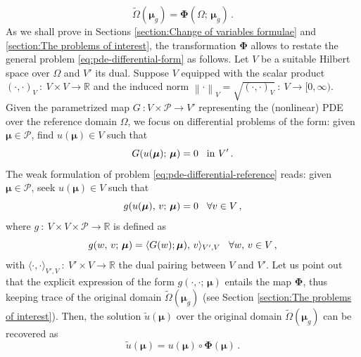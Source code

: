 \documentclass[12pt, a4paper, twoside, openright]{report}
\numberwithin{equation}{chapter}
\theoremstyle{theorem}
\theoremstyle{definition}
\theoremstyle{remark}
\theoremstyle{proposition}
\numberwithin{figure}{chapter}
\newcommand{\norm}[1]{\left\lVert#1\right\rVert}
\newcommand{\wt}[1]{\widetilde{#1}}
\newcommand{\bg}[1]{\boldsymbol{#1}}
\begin{document}
		\begin{equation}
			\label{eq:parametrized-map}
			\wt{\Omega}(\bg{\mu}_g) = \bg{\Phi}(\Omega; \, \bg{\mu}_g) \, .
		\end{equation}
		As we shall prove in Sections \ref{section:Change of variables formulae} and \ref{section:The problems of interest}, the transformation $\bg{\Phi}$ allows to restate the general problem \eqref{eq:pde-differential-form} as follows. Let $V$ be a suitable Hilbert space over $\Omega$ and $V'$ its dual. Suppose $V$ equipped with the scalar product $(\cdot, \cdot)_V ~ : ~ V \times V \rightarrow \mathbb{R}$ and the induced norm $\norm{\cdot}_V = \sqrt{(\cdot, \cdot)_V} ~ : ~ V \rightarrow [0,\infty)$. Given the parametrized map $G ~ : V \times \mathcal{P} \rightarrow V'$ representing the (nonlinear) PDE over the reference domain $\Omega$, we focus on differential problems of the form: given $\bg{\mu} \in \mathcal{P}$, find $u(\bg{\mu}) \in V$ such that
		\begin{equation}
			\label{eq:pde-differential-reference}
			G(u(\bg{\mu}); \, \bg{\mu}) = 0 \hspace*{0.3cm} \text{in $V'$} \, .
		\end{equation}
		The weak formulation of problem \eqref{eq:pde-differential-reference} reads: given $\bg{\mu} \in \mathcal{P}$, seek $u(\bg{\mu}) \in V$ such that
		\begin{equation}
			\label{eq:pde-weak-reference}
			g(u(\bg{\mu}), \, v; \, \bg{\mu}) = 0 \hspace*{0.3cm} \forall v \in V \, ,
		\end{equation}
		where $g ~ : ~ V \times V \times \mathcal{P} \rightarrow \mathbb{R}$ is defined as
		\begin{equation*}
			g(w, \, v; \, \bg{\mu}) = \langle G(w); \bg{\mu}), \, v \rangle_{V',V} \hspace*{0.3cm} \forall w, \, v \in V \, ,
		\end{equation*}
		with $\langle \cdot, \cdot \rangle_{V',V} ~ : ~ V' \times V \rightarrow \mathbb{R}$ the dual pairing between $V$ and $V'$. Let us point out that the explicit expression of the form $g(\cdot, \cdot; \, \bg{\mu})$ entails the map $\bg{\Phi}$, thus keeping trace of the original domain $\wt{\Omega}(\bg{\mu}_g)$ (see Section \ref{section:The problems of interest}). Then, the solution $\wt{u}(\bg{\mu})$ over the original domain $\wt{\Omega}(\bg{\mu}_g)$ can be recovered as
		\begin{equation}
			\wt{u}(\bg{\mu}) = u(\bg{\mu}) \circ \bg{\Phi}(\bg{\mu}) \, .
		\end{equation}
		
\end{document}
